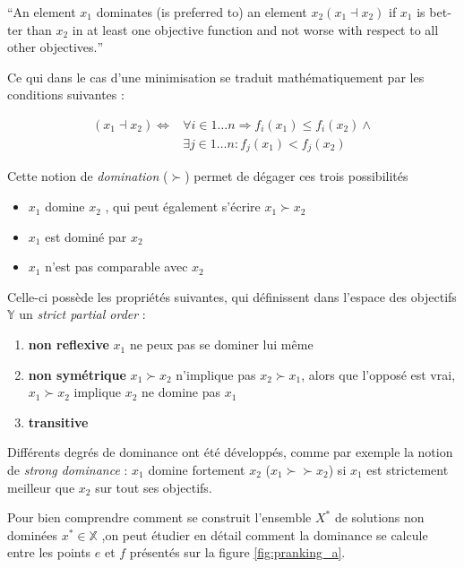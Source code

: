 \foreignquote{english}{An element $x_1$ dominates (is preferred to) an element $x_2 (x_1 \dashv x_2)$ if $x_1$ is better than $x_2$ in at least one objective function and not worse with respect to all other objectives.}

Ce qui dans le cas d'une minimisation se traduit mathématiquement par les conditions suivantes :

\begin{align*}
	(x_1 \dashv x_2) \Leftrightarrow &\forall i \in 1 \dotsc n \Rightarrow  f_i (x_1) \leq f_i (x_2) \land \\
	&\exists j \in 1 \dotsc n : f_j (x_1) < f_j (x_2)
\end{align*}

Cette notion de \textit{domination} ($\succ$)  permet de dégager ces trois possibilités

\begin{itemize}
\item $x_1$ domine $x_2$ , qui peut également s'écrire $x_1 \succ x_2$
\item $x_1$ est dominé par $x_2$
\item $x_1$ n'est pas comparable avec $x_2$
\end{itemize}

Celle-ci possède les propriétés suivantes, qui définissent dans l'espace des objectifs $\mathbb{Y}$ un \textit{strict partial order} :

\begin{enumerate}
\item{\textbf{non reflexive}}  $x_1$ ne peux pas se dominer lui même
\item{\textbf{non symétrique}} $ x_1 \succ x_2$ n'implique pas $x_2 \succ x_1$, alors que l'opposé est vrai, $x_1 \succ x_2$ implique $x_2$ ne domine pas $x_1$
\item{\textbf{transitive} }
\end{enumerate}

Différents degrés de dominance ont été développés, comme par exemple la notion de \textit{strong dominance} : $x_1$ domine fortement $x_2$ ($x_1 \succ \succ x_2$) si $x_1$ est strictement meilleur que $x_2$ sur tout ses objectifs.

Pour bien comprendre comment se construit l'ensemble $X^*$ de solutions non dominées $x^* \in \mathbb{X}$ ,on peut étudier en détail comment la dominance se calcule entre les points $e$ et $f$ présentés sur la figure \ref{fig:pranking_a}.

